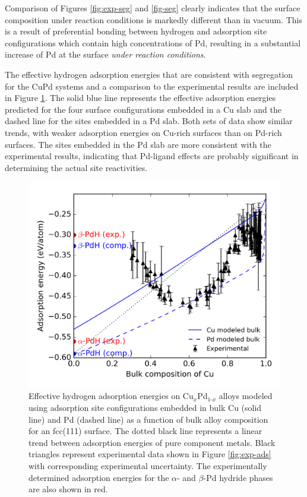 \documentclass[12pt,oneside]{cmuthesis}
\begin{document}
Comparison of Figures \ref{fig:exp-seg} and \ref{fig-seg} clearly indicates that the surface composition under reaction conditions is markedly different than in vacuum. This is a result of preferential bonding between hydrogen and adsorption site configurations which contain high concentrations of Pd, resulting in a substantial increase of Pd at the surface \emph{under reaction conditions}.

The effective hydrogen adsorption energies that are consistent with segregation for the CuPd systems and a comparison to the experimental results are included in Figure \ref{fig-results}. The solid blue line represents the effective adsorption energies predicted for the four surface configurations embedded in a Cu slab and the dashed line for the sites embedded in a Pd slab. Both sets of data show similar trends, with weaker adsorption energies on Cu-rich surfaces than on Pd-rich surfaces. The sites embedded in the Pd slab are more consistent with the experimental results, indicating that Pd-ligand effects are probably significant in determining the actual site reactivities.

\begin{figure}[h]
\centering
\includegraphics[width=5.5in]{./images/results.png}
\caption{Effective hydrogen adsorption energies on Cu\(_x\)Pd\(_{\text{1-}x}\) alloys modeled using adsorption site configurations embedded in bulk Cu (solid line) and Pd (dashed line) as a function of bulk alloy composition for an fcc(111) surface. The dotted black line represents a linear trend between adsorption energies of pure component metals. Black triangles represent experimental data shown in Figure \ref{fig:exp-ads} with corresponding experimental uncertainty. The experimentally determined adsorption energies for the \(\alpha\)- and \(\beta\)-Pd hydride phases are also shown in red. \label{fig-results}}
\end{figure}
\end{document}
